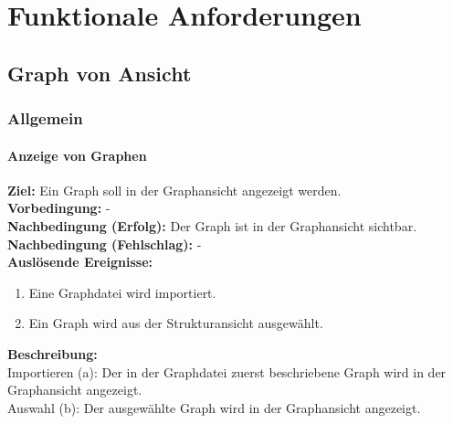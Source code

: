 \chapter{Funktionale Anforderungen}
\label{ch:funktionen}


\setcounter{fanr}{10}
\newcommand{\fano}[1]{\subsubsection{#1}\addtocounter{fanr}{10}}
\newcommand{\subfano}[1]{\subsubsection{#1}\addtocounter{fanr}{1}}
\renewcommand\thesubsubsection{/FA\ifnum\value{fanr}<10 00\else\ifnum\value{fanr}<100 0\fi\fi\arabic{fanr}/}

\section{Graph von Ansicht}

\subsection{Allgemein}

\fano{Anzeige von Graphen}\label{fa:graphen}
\textbf{Ziel:} Ein Graph soll in der Graphansicht angezeigt werden.\\
\textbf{Vorbedingung:} -\\
\textbf{Nachbedingung (Erfolg):} Der Graph ist in der Graphansicht sichtbar.\\
\textbf{Nachbedingung (Fehlschlag):} -\\
\textbf{Auslösende Ereignisse:}
\begin{enumerate}[nolistsep, label=(\alph*)]
  \item Eine Graphdatei wird importiert.
  \item Ein Graph wird aus der Strukturansicht ausgewählt.
\end{enumerate}
\textbf{Beschreibung:}\\
Importieren (a): Der in der Graphdatei zuerst beschriebene Graph wird in der Graphansicht angezeigt.\\
Auswahl (b): Der ausgewählte Graph wird in der Graphansicht angezeigt.

